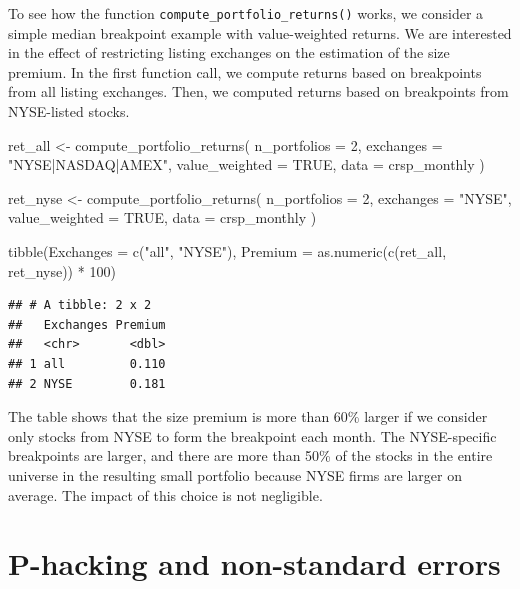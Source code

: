 \documentclass[
]{book}
\newenvironment{Shaded}{\begin{snugshade}}{\end{snugshade}}
\newcommand{\AttributeTok}[1]{\textcolor[rgb]{0.61,0.61,0.61}{#1}}
\newcommand{\ConstantTok}[1]{\textcolor[rgb]{0,0,0}{#1}}
\newcommand{\DecValTok}[1]{\textcolor[rgb]{0.06,0.06,0.06}{#1}}
\newcommand{\FunctionTok}[1]{\textcolor[rgb]{0,0,0}{#1}}
\newcommand{\NormalTok}[1]{#1}
\newcommand{\OtherTok}[1]{\textcolor[rgb]{0.37,0.37,0.37}{#1}}
\newcommand{\SpecialCharTok}[1]{\textcolor[rgb]{0,0,0}{#1}}
\newcommand{\StringTok}[1]{\textcolor[rgb]{0.5,0.5,0.5}{#1}}
\begin{document}
To see how the function \texttt{compute\_portfolio\_returns()} works, we consider a simple median breakpoint example with value-weighted returns. We are interested in the effect of restricting listing exchanges on the estimation of the size premium. In the first function call, we compute returns based on breakpoints from all listing exchanges. Then, we computed returns based on breakpoints from NYSE-listed stocks.

\begin{Shaded}
\begin{Highlighting}[]
\NormalTok{ret\_all }\OtherTok{\textless{}{-}} \FunctionTok{compute\_portfolio\_returns}\NormalTok{(}
  \AttributeTok{n\_portfolios =} \DecValTok{2}\NormalTok{,}
  \AttributeTok{exchanges =} \StringTok{"NYSE|NASDAQ|AMEX"}\NormalTok{,}
  \AttributeTok{value\_weighted =} \ConstantTok{TRUE}\NormalTok{,}
  \AttributeTok{data =}\NormalTok{ crsp\_monthly}
\NormalTok{)}

\NormalTok{ret\_nyse }\OtherTok{\textless{}{-}} \FunctionTok{compute\_portfolio\_returns}\NormalTok{(}
  \AttributeTok{n\_portfolios =} \DecValTok{2}\NormalTok{,}
  \AttributeTok{exchanges =} \StringTok{"NYSE"}\NormalTok{,}
  \AttributeTok{value\_weighted =} \ConstantTok{TRUE}\NormalTok{,}
  \AttributeTok{data =}\NormalTok{ crsp\_monthly}
\NormalTok{)}

\FunctionTok{tibble}\NormalTok{(}\AttributeTok{Exchanges =} \FunctionTok{c}\NormalTok{(}\StringTok{"all"}\NormalTok{, }\StringTok{"NYSE"}\NormalTok{), }
       \AttributeTok{Premium =} \FunctionTok{as.numeric}\NormalTok{(}\FunctionTok{c}\NormalTok{(ret\_all, ret\_nyse)) }\SpecialCharTok{*} \DecValTok{100}\NormalTok{)}
\end{Highlighting}
\end{Shaded}

\begin{verbatim}
## # A tibble: 2 x 2
##   Exchanges Premium
##   <chr>       <dbl>
## 1 all         0.110
## 2 NYSE        0.181
\end{verbatim}

The table shows that the size premium is more than 60\% larger if we consider only stocks from NYSE to form the breakpoint each month. The NYSE-specific breakpoints are larger, and there are more than 50\% of the stocks in the entire universe in the resulting small portfolio because NYSE firms are larger on average. The impact of this choice is not negligible.

\hypertarget{p-hacking-and-non-standard-errors}{%
\section{P-hacking and non-standard errors}\label{p-hacking-and-non-standard-errors}}
\end{document}
